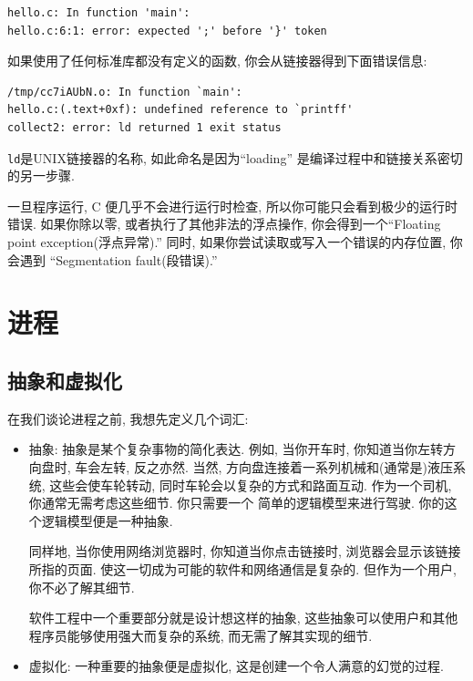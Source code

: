 \documentclass[12pt]{book}
\begin{document}
{\begin{verbatim}
hello.c: In function 'main':
hello.c:6:1: error: expected ';' before '}' token
\end{verbatim}

如果使用了任何标准库都没有定义的函数,
你会从链接器得到下面错误信息:

\begin{verbatim}
/tmp/cc7iAUbN.o: In function `main':
hello.c:(.text+0xf): undefined reference to `printff'
collect2: error: ld returned 1 exit status
\end{verbatim}

{\tt ld}是UNIX链接器的名称, 
如此命名是因为``loading'' 是编译过程中和链接关系密切的另一步骤.

一旦程序运行, C 便几乎不会进行运行时检查,
所以你可能只会看到极少的运行时错误.
如果你除以零, 或者执行了其他非法的浮点操作, 
你会得到一个``Floating point exception(浮点异常).''
同时, 如果你尝试读取或写入一个错误的内存位置,
你会遇到 ``Segmentation fault(段错误).''



\chapter{进程}

\section{抽象和虚拟化}

在我们谈论进程之前, 我想先定义几个词汇:

\begin{itemize}

\item 抽象: 抽象是某个复杂事物的简化表达.
例如, 当你开车时, 你知道当你左转方向盘时, 车会左转,
反之亦然. 当然, 方向盘连接着一系列机械和(通常是)液压系统, 
这些会使车轮转动, 同时车轮会以复杂的方式和路面互动.
作为一个司机, 你通常无需考虑这些细节. 你只需要一个
简单的逻辑模型来进行驾驶. 你的这个逻辑模型便是一种抽象.

同样地, 当你使用网络浏览器时, 你知道当你点击链接时,
浏览器会显示该链接所指的页面.
使这一切成为可能的软件和网络通信是复杂的.
但作为一个用户, 你不必了解其细节.

软件工程中一个重要部分就是设计想这样的抽象,
这些抽象可以使用户和其他程序员能够使用强大而复杂的系统,
而无需了解其实现的细节.

\item 虚拟化: 一种重要的抽象便是虚拟化, 这是创建一个令人满意的幻觉的过程.


\end{itemize}}
\end{document}
